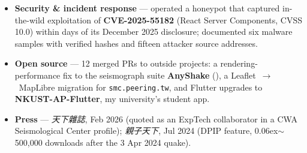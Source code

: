 \documentclass{resume}
\begin{document}
\begin{itemize}
  \item \textbf{Security \& incident response} --- operated a honeypot that captured in-the-wild
    exploitation of \textbf{CVE-2025-55182} (React Server Components, CVSS 10.0) within days of its
    December 2025 disclosure; documented six malware samples with verified hashes and fifteen
    attacker source addresses.
  \item \textbf{Open source} --- 12 merged PRs to outside projects: a rendering-performance fix to
    the seismograph suite \textbf{AnyShake}
    (), a
    Leaflet~$\rightarrow$~MapLibre migration for \texttt{smc.peering.tw}, and Flutter upgrades to
    \textbf{NKUST-AP-Flutter}, my university's student app.
  \item \textbf{Press} --- \emph{天下雜誌}, Feb 2026 (quoted as an ExpTech collaborator in a CWA
    Seismological Center profile); \emph{親子天下}, Jul 2024 (DPIP feature,
    {\raise0.06ex\hbox{$\sim$}}500,000 downloads after the 3 Apr 2024 quake).
\end{itemize}
\end{document}
